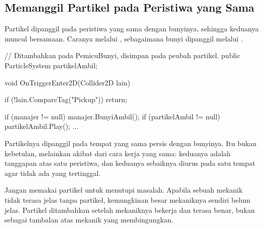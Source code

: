\subsection{Memanggil Partikel pada Peristiwa yang Sama}

Partikel dipanggil pada peristiwa yang sama dengan bunyinya, sehingga
keduanya muncul bersamaan. Caranya melalui ,
sebagaimana bunyi dipanggil melalui .

\begin{kodekeluaran}
// Ditambahkan pada PemicuBunyi, disimpan pada peubah partikel.
public ParticleSystem partikelAmbil;

void OnTriggerEnter2D(Collider2D lain)
{
    if (!lain.CompareTag("Pickup")) return;

    if (manajer != null) manajer.BunyiAmbil();
    if (partikelAmbil != null) partikelAmbil.Play();
    ...
}
\end{kodekeluaran}

Partikelnya dipanggil pada tempat yang sama persis dengan
bunyinya. Itu bukan kebetulan, melainkan akibat dari cara kerja yang sama:
keduanya adalah tanggapan atas satu peristiwa, dan keduanya sebaiknya
diurus pada satu tempat agar tidak ada yang tertinggal.

\begin{peringatanbox}
Jangan memakai partikel untuk menutupi masalah. Apabila sebuah mekanik tidak
terasa jelas tanpa partikel, kemungkinan besar mekaniknya sendiri belum jelas.
Partikel ditambahkan setelah mekaniknya bekerja dan terasa benar, bukan sebagai
tambalan atas mekanik yang membingungkan.
\end{peringatanbox}
